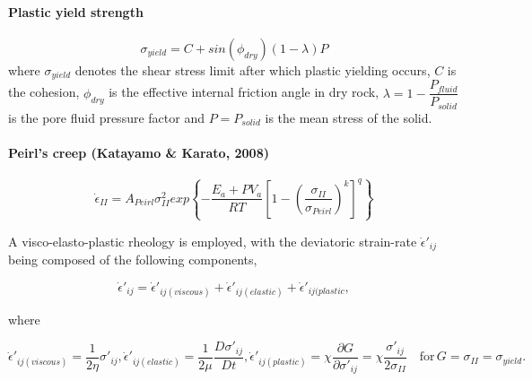 \paragraph{Plastic yield strength}
\begin{equation}\label{eqs:mohr_coulomb}
\sigma_{yield} = C + sin(\phi_{dry})(1-\lambda) P
\end{equation}
where $\sigma_{yield}$ denotes the shear stress limit after which plastic yielding occurs, $C$ is the cohesion, $\phi_{dry}$ is the effective internal friction angle in dry rock, $\lambda=1-\dfrac{P_{fluid}}{P_{solid}}$ is the pore fluid pressure factor and $P=P_{solid}$ is the mean stress of the solid.

\paragraph{Peirl's creep (Katayamo \& Karato, 2008)}
\begin{equation}\label{eqs:peirls_strain_rate}
\dot{\epsilon}_{II} = A_{Peirl} \sigma_{II}^2 exp \left\lbrace -\dfrac{E_a + P V_a}{R T}  \left[ 1- \left( \dfrac{\sigma_{II}}{\sigma_{Peirl}} \right) ^k \right] ^q \right\rbrace
\end{equation}

A visco-elasto-plastic rheology is employed, with the deviatoric strain-rate $\dot{\epsilon}'_{ij}$ being composed of the following components,

\begin{equation}
\dot{\epsilon}'_{ij} = \dot{\epsilon}'_{ij(viscous)} + \dot{\epsilon}'_{ij(elastic)} + \dot{\epsilon}'_{ij(plastic},
\end{equation}

where

\begin{subequations}
\begin{equation}
\dot{\epsilon}'_{ij(viscous)} = \dfrac{1}{2 \eta} \sigma'_{ij},
\end{equation}
\begin{equation}
\dot{\epsilon}'_{ij(elastic)} = \dfrac{1}{2 \mu} \dfrac{D \sigma'_{ij}}{D t},
\end{equation}
\begin{equation}
\dot{\epsilon}'_{ij(plastic)} = \chi \dfrac{\partial G}{\partial \sigma'_{ij}} = \chi \dfrac{\sigma'_{ij}}{2 \sigma_{II}} \quad \text{for}\, G = \sigma_{II} = \sigma_{yield}.
\end{equation}
\end{subequations}

